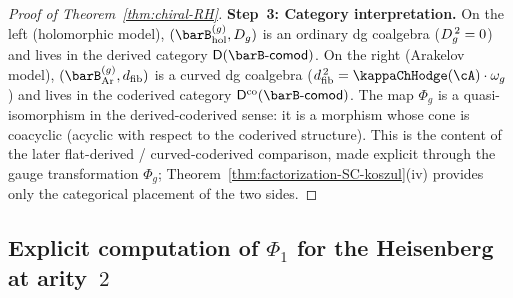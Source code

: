 \begin{proof}[Proof of Theorem~\textup{\ref{thm:chiral-RH}}]
\smallskip\noindent
\textbf{Step~3: Category interpretation.}
On the left (holomorphic model), $(\barB^{(g)}_{\mathrm{hol}},\Dg{g})$
is an ordinary dg coalgebra ($D_{g}^{\,2} = 0$) and lives in the
derived category $\mathsf{D}(\barB\text{-}\mathsf{comod})$. On the
right (Arakelov model), $(\barB^{(g)}_{\mathrm{Ar}}, \dfib)$ is a
curved dg coalgebra ($\dfib^{\,2} = \kappaChHodge(\cA) \cdot \omega_g$) and
lives in the coderived category
$\mathsf{D}^{\mathrm{co}}(\barB\text{-}\mathsf{comod})$. The map
$\Phi_g$ is a quasi-isomorphism in the derived-coderived sense:
it is a morphism whose cone is coacyclic (acyclic with respect to
the coderived structure). This is the content of the
later flat-derived / curved-coderived comparison, made explicit
through the gauge transformation $\Phi_g$; Theorem~\ref{thm:factorization-SC-koszul}(iv)
provides only the categorical placement of the two sides.
\end{proof}

\subsection{Explicit computation of $\Phi_1$ for the Heisenberg
at arity~$2$}
\label{subsec:Phi-1-heisenberg}

